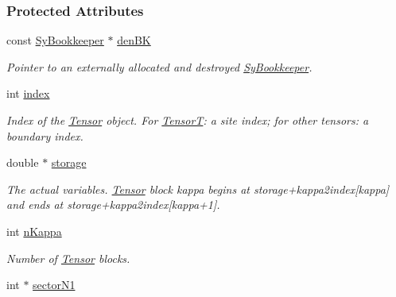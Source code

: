 \subsubsection*{Protected Attributes}
\begin{DoxyCompactItemize}
\item 
\hypertarget{classCheMPS2_1_1Tensor_abecca6b02b8793a6dcc7b121e0e2a60c}{const \hyperlink{classCheMPS2_1_1SyBookkeeper}{Sy\-Bookkeeper} $\ast$ \hyperlink{classCheMPS2_1_1Tensor_abecca6b02b8793a6dcc7b121e0e2a60c}{den\-B\-K}}\label{classCheMPS2_1_1Tensor_abecca6b02b8793a6dcc7b121e0e2a60c}

\begin{DoxyCompactList}\small\item\em Pointer to an externally allocated and destroyed \hyperlink{classCheMPS2_1_1SyBookkeeper}{Sy\-Bookkeeper}. \end{DoxyCompactList}\item 
\hypertarget{classCheMPS2_1_1Tensor_aba3ee18f13eee357ed13789809082120}{int \hyperlink{classCheMPS2_1_1Tensor_aba3ee18f13eee357ed13789809082120}{index}}\label{classCheMPS2_1_1Tensor_aba3ee18f13eee357ed13789809082120}

\begin{DoxyCompactList}\small\item\em Index of the \hyperlink{classCheMPS2_1_1Tensor}{Tensor} object. For \hyperlink{classCheMPS2_1_1TensorT}{Tensor\-T}\-: a site index; for other tensors\-: a boundary index. \end{DoxyCompactList}\item 
\hypertarget{classCheMPS2_1_1Tensor_ae38c4be492a8bf729d472e5a0c1d6d12}{double $\ast$ \hyperlink{classCheMPS2_1_1Tensor_ae38c4be492a8bf729d472e5a0c1d6d12}{storage}}\label{classCheMPS2_1_1Tensor_ae38c4be492a8bf729d472e5a0c1d6d12}

\begin{DoxyCompactList}\small\item\em The actual variables. \hyperlink{classCheMPS2_1_1Tensor}{Tensor} block kappa begins at storage+kappa2index\mbox{[}kappa\mbox{]} and ends at storage+kappa2index\mbox{[}kappa+1\mbox{]}. \end{DoxyCompactList}\item 
\hypertarget{classCheMPS2_1_1Tensor_a7ee0f7d7b174ece70b2c1b22ba73baac}{int \hyperlink{classCheMPS2_1_1Tensor_a7ee0f7d7b174ece70b2c1b22ba73baac}{n\-Kappa}}\label{classCheMPS2_1_1Tensor_a7ee0f7d7b174ece70b2c1b22ba73baac}

\begin{DoxyCompactList}\small\item\em Number of \hyperlink{classCheMPS2_1_1Tensor}{Tensor} blocks. \end{DoxyCompactList}\item 
\hypertarget{classCheMPS2_1_1Tensor_a37187693907718ad690871a8f0c60a0a}{int $\ast$ \hyperlink{classCheMPS2_1_1Tensor_a37187693907718ad690871a8f0c60a0a}{sector\-N1}}\label{classCheMPS2_1_1Tensor_a37187693907718ad690871a8f0c60a0a}


\end{DoxyCompactItemize}
